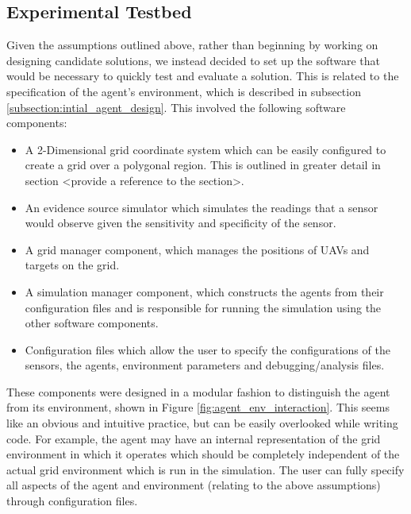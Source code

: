 \subsection{Experimental Testbed}
Given the assumptions outlined above, rather than beginning by working on designing candidate solutions, we instead decided to set up the software that would be necessary to quickly test and evaluate a solution. This is related to the specification of the agent's environment, which is described in subsection \ref{subsection:intial_agent_design}. This involved the following software components:
\begin{itemize}
    \item A 2-Dimensional grid coordinate system which can be easily configured to create a grid over a polygonal region. This is outlined in greater detail in section <provide a reference to the section>.
    \item An evidence source simulator which simulates the readings that a sensor would observe given the sensitivity and specificity of the sensor.
    \item A grid manager component, which manages the positions of UAVs and targets on the grid.
    \item A simulation manager component, which constructs the agents from their configuration files and is responsible for running the simulation using the other software components.
    \item Configuration files which allow the user to specify the configurations of the sensors, the agents, environment parameters and debugging/analysis files.
\end{itemize}
These components were designed in a modular fashion to distinguish the agent from its environment, shown in Figure \ref{fig:agent_env_interaction}. This seems like an obvious and intuitive practice, but can be easily overlooked while writing code. For example, the agent may have an internal representation of the grid environment in which it operates which should be completely independent of the actual grid environment which is run in the simulation. The user can fully specify all aspects of the agent and environment (relating to the above assumptions) through configuration files. 



